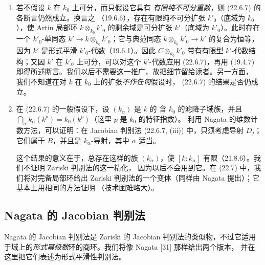 \begin{remark}[22.6.9]
\label{0.22.6.9-fr}
\begin{enumerate}
  \item[\rm(i)] 若不假设 $k$ 在 $k_0$ 上可分，而只假设它具有
  \emph{有限纯不可分重数}，则 (22.6.7) 的各断言仍然成立。换言之
  （19.6.6），存在有限纯不可分扩张 $k'_0$（底域为 $k_0$），使 Artin 局部环
  $k\otimes_{k_0}k'_0$ 的剩余域是可分扩张 $k'$（底域为 $k'_0$）。此时存在一个
  $k'_0$-单同态
  $k'\longrightarrow k\otimes_{k_0}k'_0$；它与典范同态
  $k\otimes_{k_0}k'_0\longrightarrow k'$ 的复合为恒等，因为 $k'$ 是形式平滑
  $k'_0$-代数（19.6.1）。因此
  $C\otimes_{k_0}k'_0$ 带有有限型 $k'$-代数结构；又因 $k'$ 在
  $k'_0$ 上可分，可以对这个 $k'$-代数应用 (22.6.7)，再用 (19.4.7)
  即得所述断言。我们以后不需要这一推广，故把细节留给读者。另一方面，
  我们不知道在对 $k$ 在 $k_0$ 上的扩张\emph{不作任何}假设时，
  (22.6.7) 的结果是否仍成立。
  \item[\rm(ii)] 在 (22.6.7) 的一般假设下，设 $(k_\alpha)$ 是 $k$ 的
  含 $k_0$ 的滤降子域族，并且
  $\bigcap_\alpha k_\alpha(k^p)=k_0(k^p)$（这里 $p$ 是 $k_0$ 的特征指数）。
  利用 Nagata 的维数计数方法，可以证明：在 Jacobian 判别法
  (22.6.7, (iii)) 中，只须考虑导射 $D_j$；它们属于 $B$，并且是
  $k_\alpha$-导射，其中 $\alpha$ 适当。


  这个结果的意义在于，总存在这样的族 $(k_\alpha)$，使
  $[k:k_\alpha]$ 有限（21.8.6）。我们不证明 Zariski 判别法的这一精化，
  因为以后不会用到它。在 (22.7) 中，我们将对完备局部环给出 Zariski
  判别法的一个变体（同样由 Nagata 提出）；它基本上用相同的方法证明
  （技术困难略大）。
\end{enumerate}
\end{remark}

\subsection{Nagata 的 Jacobian 判别法}
\label{subsection:0.22.7-fr}

\begin{env}[22.7.1]
\label{0.22.7.1-fr}
Nagata 的 Jacobian 判别法是 Zariski 的 Jacobian 判别法的类似物，不过它适用
于域上的\emph{形式幂级数}环的商环。我们将像 Nagata [31] 那样给出两个版本，
并在这里把它们表述为形式平滑性判别法。
\end{env}

